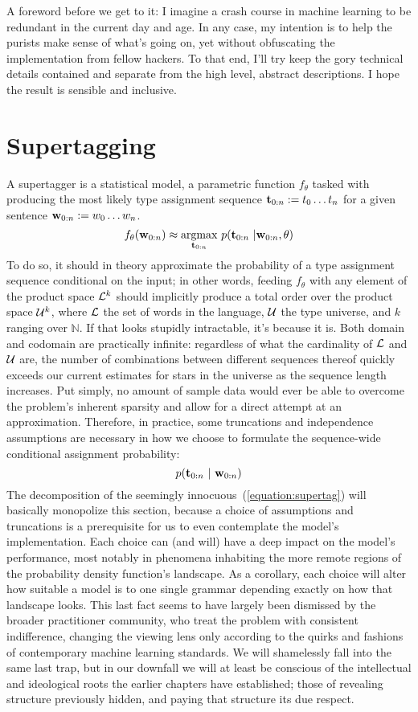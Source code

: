 A foreword before we get to it: I imagine a crash course in machine learning to be redundant in the current day and age.
In any case, my intention is to help the purists make sense of what's going on, yet without obfuscating the implementation from fellow hackers.
To that end, I'll try keep the gory technical details contained and separate from the high level, abstract descriptions.
I hope the result is sensible and inclusive.


\section{Supertagging}
A supertagger is a statistical model, a parametric function $f_\theta$ tasked with producing the most likely type assignment sequence $\mathbf{t}_{0:n} := t_0 \dots t_n$ for a given sentence $\mathbf{w}_{0:n} := w_0 \dots w_n$.
\begin{equation}
	f_\theta(\mathbf{w}_{0:n}) \approx \underset{\mathbf{t}_{0:n}}{\mathrm{argmax}} ~ p(\mathbf{t}_{0:n} \ | \mathbf{w}_{0:n}, \theta)
\end{equation}
To do so, it should in theory approximate the probability of a type assignment sequence conditional on the input; in other words, feeding $f_\theta$ with any element of the product space $\mathcal{L}^k$ should implicitly produce a total order over the product space $\mathcal{U}^{k}$, where $\mathcal{L}$ the set of words in the language, $\mathcal{U}$ the type universe, and $k$ ranging over $\mathbb{N}$.
If that looks stupidly intractable, it's because it is.
Both domain and codomain are practically infinite: regardless of what the cardinality of $\mathcal{L}$ and $\mathcal{U}$ are, the number of combinations between different sequences thereof quickly exceeds our current estimates for stars in the universe as the sequence length increases.
Put simply, no amount of sample data would ever be able to overcome the problem's inherent sparsity and allow for a direct attempt at an approximation.
Therefore, in practice, some truncations and independence assumptions are necessary in how we choose to formulate the sequence-wide conditional assignment probability:
\begin{equation}\label{equation:supertag}
p(\mathbf{t}_{0:n} \ | \ \mathbf{w}_{0:n})
\end{equation}
The decomposition of the seemingly innocuous~(\ref{equation:supertag}) will basically monopolize this section, because a choice of assumptions and truncations is a prerequisite for us to even contemplate the model's implementation.
Each choice can (and will) have a deep impact on the model's performance, most notably in phenomena inhabiting the more remote regions of the probability density function's landscape.
As a corollary, each choice will alter how suitable a model is to one single grammar depending exactly on how that landscape looks.
This last fact seems to have largely been dismissed by the broader practitioner community, who treat the problem with consistent indifference, changing the viewing lens only according to the quirks and fashions of contemporary machine learning standards.
We will shamelessly fall into the same last trap, but in our downfall we will at least be conscious of the intellectual and ideological roots the earlier chapters have established; those of revealing structure previously hidden, and paying that structure its due respect.


